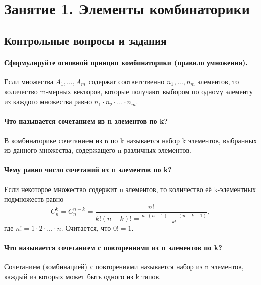 \documentclass{book}
\begin{document}
\tableofcontents

\pagestyle{plain}

\chapter*{Занятие 1. Элементы комбинаторики}

\section*{Контрольные вопросы и задания}

\subsubsection*{Сформулируйте основной принцип комбинаторики (правило умножения).}

Если множества $A_1, ..., A_m$ содержат соответственно $n_1, ..., n_m$ элементов, то количество m-мерных векторов, которые получают выбором по одному элементу из каждого множества равно $n_1\cdot n_2\cdot...\cdot n_m$.

\subsubsection*{Что называется сочетанием из n элементов по k?}

В комбинаторике сочетанием из n по k называется набор k элементов, выбранных из данного множества, содержащего n различных элементов.

\subsubsection*{Чему равно число сочетаний из n элементов по k?}

Если некоторое множество содержит n элементов, то количество её k-элементных подмножеств равно $$C_n^k=C_n^{n-k}=\frac{n!}{k!\left(n-k\right)!=\frac{n\cdot\left(n-1\right)\cdot...\cdot\left(n-k+1\right)}{k!}},$$ где $n!=1\cdot 2\cdot...\cdot n$. Считается, что $0!=1$.

\subsubsection*{Что называется сочетанием с повторениями из n элементов по k?}

Сочетанием (комбинацией) с повторениями называется набор из n элементов, каждый из которых может быть одного из k типов.
\end{document}
